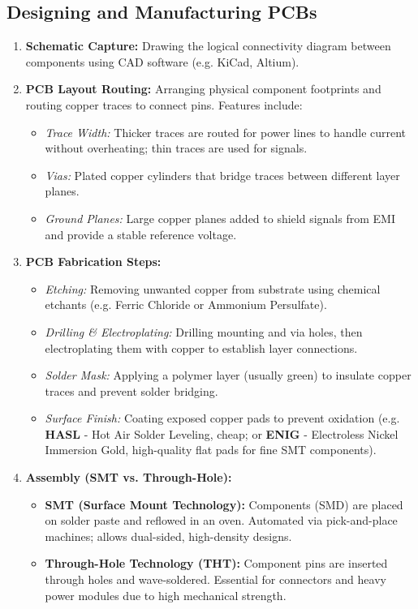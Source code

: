 \documentclass[12pt,a4paper]{article}
\begin{document}
\subsection{Designing and Manufacturing PCBs}
\begin{enumerate}[leftmargin=*, itemsep=4.0pt]
  \item \textbf{Schematic Capture:} Drawing the logical connectivity diagram between components using CAD software (e.g. KiCad, Altium).
  \item \textbf{PCB Layout Routing:} Arranging physical component footprints and routing copper traces to connect pins. Features include:
        \begin{itemize}[leftmargin=*, label=$\bullet$, itemsep=1.0pt]
          \item \textit{Trace Width:} Thicker traces are routed for power lines to handle current without overheating; thin traces are used for signals.
          \item \textit{Vias:} Plated copper cylinders that bridge traces between different layer planes.
          \item \textit{Ground Planes:} Large copper planes added to shield signals from EMI and provide a stable reference voltage.
        \end{itemize}
  \item \textbf{PCB Fabrication Steps:}
        \begin{itemize}[leftmargin=*, label=$\bullet$, itemsep=1.0pt]
          \item \textit{Etching:} Removing unwanted copper from substrate using chemical etchants (e.g. Ferric Chloride or Ammonium Persulfate).
          \item \textit{Drilling \& Electroplating:} Drilling mounting and via holes, then electroplating them with copper to establish layer connections.
          \item \textit{Solder Mask:} Applying a polymer layer (usually green) to insulate copper traces and prevent solder bridging.
          \item \textit{Surface Finish:} Coating exposed copper pads to prevent oxidation (e.g. \textbf{HASL} - Hot Air Solder Leveling, cheap; or \textbf{ENIG} - Electroless Nickel Immersion Gold, high-quality flat pads for fine SMT components).
        \end{itemize}
  \item \textbf{Assembly (SMT vs. Through-Hole):}
        \begin{itemize}[leftmargin=*, label=$\bullet$, itemsep=1pt]
          \item \textbf{SMT (Surface Mount Technology):} Components (SMD) are placed on solder paste and reflowed in an oven. Automated via pick-and-place machines; allows dual-sided, high-density designs.
          \item \textbf{Through-Hole Technology (THT):} Component pins are inserted through holes and wave-soldered. Essential for connectors and heavy power modules due to high mechanical strength.
        \end{itemize}
\end{enumerate}
\end{document}
